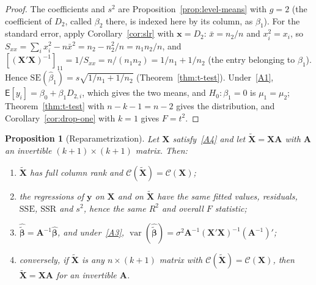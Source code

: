 \documentclass[14pt]{extarticle}
\theoremstyle{plain}
\newtheorem{proposition}[theorem]{Proposition}
\theoremstyle{definition}
\theoremstyle{remark}
\newcommand\expc{\mathsf{E}}
\DeclareMathOperator\var{var}
\newcommand{\SSR}{\mathrm{SSR}}
\newcommand{\SSE}{\mathrm{SSE}}
\newcommand{\SE}{\mathrm{SE}}
\newcommand{\bX}{\mathbf{X}}
\newcommand{\by}{\mathbf{y}}
\newcommand{\bx}{\mathbf{x}}
\def\bb{\boldsymbol{\beta}}
\newcommand{\bA}{\mathbf{A}}
\newcommand{\calC}{\mathcal{C}}
\begin{document}
\begin{proof}
The coefficients and $s^2$ are Proposition~\ref{prop:level-means} with $g = 2$ (the coefficient of $D_2$, called $\beta_2$ there, is indexed here by its column, as $\beta_1$). For the standard error, apply Corollary~\ref{cor:slr} with $\bx = D_2$: $\bar x = n_2/n$ and $x_i^2 = x_i$, so $S_{xx} = \sum_i x_i^2 - n\bar x^2 = n_2 - n_2^2/n = n_1n_2/n$, and $[(\bX'\bX)^{-1}]_{11} = 1/S_{xx} = n/(n_1n_2) = 1/n_1 + 1/n_2$ (the entry belonging to $\beta_1$). Hence $\SE(\hat\beta_1) = s\sqrt{1/n_1 + 1/n_2}$ (Theorem~\ref{thm:t-test}). Under~\ref{A1}, $\expc[y_i] = \beta_0 + \beta_1D_{2,i}$, which gives the two means, and $H_0\colon \beta_1 = 0$ is $\mu_1 = \mu_2$; Theorem~\ref{thm:t-test} with $n - k - 1 = n - 2$ gives the distribution, and Corollary~\ref{cor:drop-one} with $k = 1$ gives $F = t^2$.
\end{proof}

\begin{proposition}[Reparametrization]\label{prop:reparam}
Let $\bX$ satisfy~\ref{A4} and let $\tilde{\bX} = \bX\bA$ with $\bA$ an invertible $(k+1) \times (k+1)$ matrix. Then:
\begin{enumerate}[label=\textup{(\roman*)}]
\item $\tilde{\bX}$ has full column rank and $\calC(\tilde{\bX}) = \calC(\bX)$;
\item\label{rp:ii} the regressions of $\by$ on $\bX$ and on $\tilde{\bX}$ have the same fitted values, residuals, $\SSE$, $\SSR$ and $s^2$, hence the same $R^2$ and overall $F$ statistic;
\item\label{rp:iii} $\hat{\tilde{\bb}} = \bA^{-1}\hat{\bb}$, and under~\ref{A3}, $\var(\hat{\tilde{\bb}}) = \sigma^2\bA^{-1}(\bX'\bX)^{-1}(\bA^{-1})'$;
\item\label{rp:iv} conversely, if $\tilde{\bX}$ is any $n \times (k+1)$ matrix with $\calC(\tilde{\bX}) = \calC(\bX)$, then $\tilde{\bX} = \bX\bA$ for an invertible $\bA$.
\end{enumerate}
\end{proposition}
\end{document}
